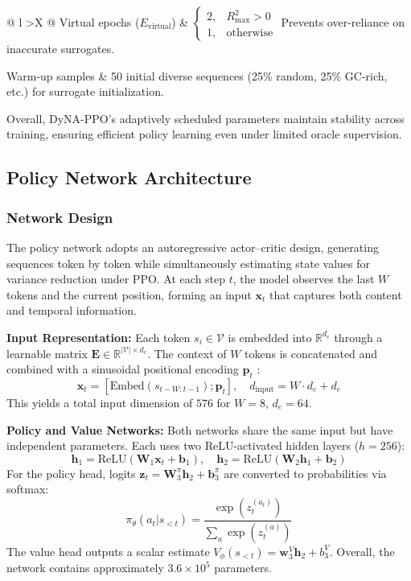 \documentclass[conference]{IEEEtran}
\begin{document}
\begin{table}[t]
\begin{tabularx}{\columnwidth}{@{} l >{\RaggedRight}X @{}}
Virtual epochs ($E_{\text{virtual}}$) &
\(
\begin{cases}
2,& R^2_{\max}>0\\
1,& \text{otherwise}
\end{cases}
\)
Prevents over-reliance on inaccurate surrogates. \\ \addlinespace

Warm-up samples & 50 initial diverse sequences (25\% random, 25\% GC-rich, etc.) for surrogate initialization. \\
\bottomrule
\end{tabularx}
\end{table}

Overall, DyNA-PPO’s adaptively scheduled parameters maintain stability across training, ensuring efficient policy learning even under limited oracle supervision.









\subsection{Policy Network Architecture}

\subsubsection{Network Design}

The policy network adopts an autoregressive actor–critic design, generating sequences token by token while simultaneously estimating state values for variance reduction under PPO. At each step $t$, the model observes the last $W$ tokens and the current position, forming an input $\mathbf{x}_t$ that captures both content and temporal information.

\textbf{Input Representation:} 
Each token $s_i \in \mathcal{V}$ is embedded into $\mathbb{R}^{d_e}$ through a learnable matrix $\mathbf{E} \in \mathbb{R}^{|\mathcal{V}| \times d_e}$. The context of $W$ tokens is concatenated and combined with a sinusoidal positional encoding $\mathbf{p}_t$ \cite{vaswani2017attention}:
\[
\mathbf{x}_t = [\text{Embed}(s_{t-W:t-1}); \mathbf{p}_t], \quad d_{\text{input}} = W \cdot d_e + d_e
\]
This yields a total input dimension of $576$ for $W=8$, $d_e=64$.

\textbf{Policy and Value Networks:} 
Both networks share the same input but have independent parameters. Each uses two ReLU-activated hidden layers ($h=256$):
\[
\mathbf{h}_1 = \text{ReLU}(\mathbf{W}_1 \mathbf{x}_t + \mathbf{b}_1), \quad
\mathbf{h}_2 = \text{ReLU}(\mathbf{W}_2 \mathbf{h}_1 + \mathbf{b}_2)
\]
For the policy head, logits $\mathbf{z}_t = \mathbf{W}_3^\pi \mathbf{h}_2 + \mathbf{b}_3^\pi$ are converted to probabilities via softmax:
\[
\pi_\theta(a_t|s_{<t}) = \frac{\exp(z_t^{(a_t)})}{\sum_a \exp(z_t^{(a)})}
\]
The value head outputs a scalar estimate $V_\phi(s_{<t}) = \mathbf{w}_3^V \mathbf{h}_2 + b_3^V$.  
Overall, the network contains approximately $3.6\times 10^5$ parameters.
\end{document}
